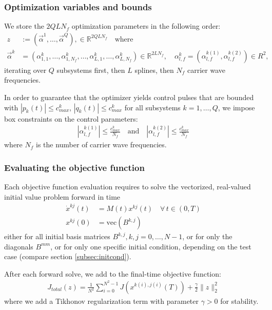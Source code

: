 \documentclass[letterpaper]{article}
\newcommand{\R}{\mathds{R}}
\begin{document}
  \subsubsection{Optimization variables and bounds}
  We store the $2QLN_f$ optimization parameters in the following order:
  \begin{align}
    z &:= \left( \vec{\alpha}^1, \dots, \vec{\alpha}^Q \right), \in
    \mathds{R}^{2QLN_f} \quad \text{where}\\
    \vec{\alpha}^k &= \left( \alpha_{1,1}^k,\dots, \alpha_{1,N_f}^k, \dots,
    \alpha_{L,1}^{k}, \dots, \alpha_{L,N_f}^k \right) \in \R^{2LN_f}, \quad
    \alpha_{l,f}^k = \left(\alpha_{l,f}^{k(1)}, \alpha_{l,f}^{k(2)} \right) \in
    R^2,
  \end{align}
  iterating over $Q$ subsystems first, then $L$ splines, then $N_f$ carrier wave
  frequencies. 

  In order to guarantee that the optimizer yields control pulses that are
  bounded with $|p_k(t)| \leq c^k_{max}$, $|q_k(t)| \leq c^k_{max}$ for all
  subsystems $k=1,\dots, Q$, we impose box constraints on the control
  parameters:
   \begin{align}
     | \alpha_{l,f}^{k(1)}| \leq \frac{c^k_{max}}{N_f} \quad \text{and} \quad |
     \alpha_{l,f}^{k(2)} | \leq \frac{c^k_{max}}{N_f}
   \end{align}
   where $N_f$ is the number of carrier wave frequencies.



  \subsubsection{Evaluating the objective function}
    Each objective function evaluation requires to solve the vectorized,
    real-valued initial value problem forward in time
    \begin{align*}
      \dot x^{kj}(t) &= M(t) x^{kj}(t) \quad \forall \, t\in (0,T) \\
      x^{kj}(0) &= \mbox{vec}(B^{k,j})
    \end{align*}
    either for all initial basis matrices $B^{k,j}, k,j=0,\dots,N-1$, or for
    only the diagonals $B^{mm}$, or for only one specific initial condition,
    depending on the test case (compare section \ref{subsec:initcond}). 

    After each forward solve, we add to the final-time objective function:
    \begin{align}
      J_{total}(z) = \frac{1}{N^2} \sum_{i=0}^{N^2-1} J\left(x^{k(i),
      j(i)}(T)\right) + \frac{\gamma}{2} \| z\|^2_2
    \end{align}
    where we add a Tikhonov regularization term with parameter $\gamma>0$ for
    stability.
\end{document}
